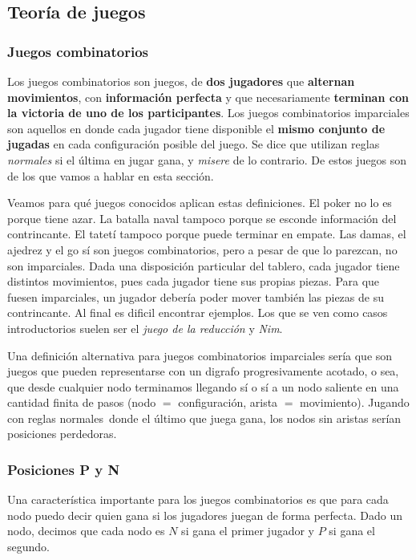 \subsection*{Teoría de juegos}

\subsubsection*{Juegos combinatorios}

Los juegos combinatorios son juegos, de \textbf{dos jugadores} que
\textbf{alternan movimientos}, con \textbf{información perfecta} y que
necesariamente \textbf{terminan con la victoria de uno de los participantes}.
Los juegos combinatorios imparciales son aquellos en donde cada jugador tiene
disponible el \textbf{mismo conjunto de jugadas} en cada configuración posible
del juego. Se dice que utilizan reglas \textit{normales} si el última en jugar
gana, y \textit{misere} de lo contrario. De estos juegos son de los que vamos a
hablar en esta sección.

Veamos para qué juegos conocidos aplican estas definiciones. El poker no lo es
porque tiene azar. La batalla naval tampoco porque se esconde información del
contrincante. El tatetí tampoco porque puede terminar en empate. Las damas, el
ajedrez y el go sí son juegos combinatorios, pero a pesar de que lo parezcan, no
son imparciales. Dada una disposición particular del tablero, cada jugador tiene
distintos movimientos, pues cada jugador tiene sus propias piezas. Para que
fuesen imparciales, un jugador debería poder mover también las piezas de su
contrincante. Al final es dificil encontrar ejemplos. Los que se ven como casos
introductorios suelen ser el \textit{juego de la reducción} y \textit{Nim}.

Una definición alternativa para juegos combinatorios imparciales sería que son
juegos que pueden representarse con un digrafo progresivamente acotado, o sea,
que desde cualquier nodo terminamos llegando sí o sí a un nodo saliente en una
cantidad finita de pasos (nodo $=$ configuración, arista $=$ movimiento).
Jugando con reglas normales donde el último que juega gana, los nodos
sin aristas serían posiciones perdedoras.

\subsubsection*{Posiciones P y N}

Una característica importante para los juegos combinatorios es que para cada
nodo puedo decir quien gana si los jugadores juegan de forma perfecta. Dado un
nodo, decimos que cada nodo es $N$ si gana el primer jugador y $P$ si gana el
segundo.

